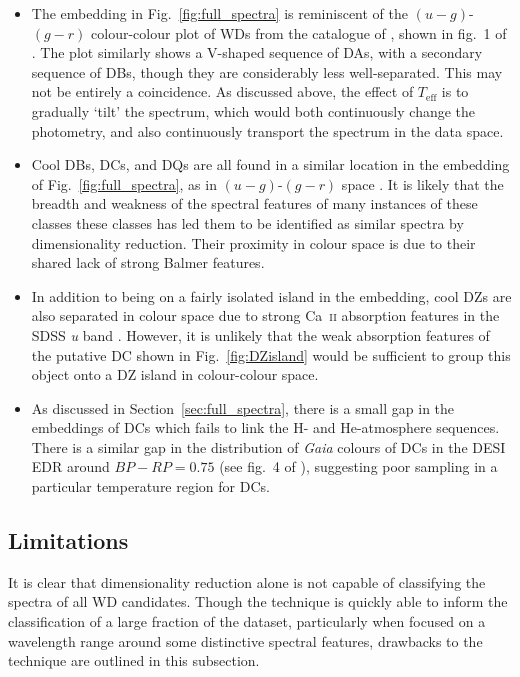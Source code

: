 \documentclass[fleqn,usenatbib]{mnras}
\def\Teff{T_\mathrm{eff}}
\begin{document}
\begin{itemize}
\item
The embedding in Fig.~\ref{fig:full_spectra} is reminiscent of the $(u-g)$-$(g-r)$ colour-colour plot of WDs from the catalogue of \citet{gentilefusillo19}, shown in fig.~1 of \citet{manser20}.
The plot similarly shows a V-shaped sequence of DAs, with a secondary sequence of DBs, though they are considerably less well-separated.
This may not be entirely a coincidence.
As discussed above, the effect of $\Teff$ is to gradually `tilt' the spectrum, which would both continuously change the photometry, and also continuously transport the spectrum in the data space.
\item
Cool DBs, DCs, and DQs are all found in a similar location in the embedding of Fig.~\ref{fig:full_spectra}, as in $(u-g)$-$(g-r)$ space \citep{manser20}.
It is likely that the breadth and weakness of the spectral features of many instances of these classes these classes has led them to be identified as similar spectra by dimensionality reduction.
Their proximity in colour space is due to their shared lack of strong Balmer features.
\item
In addition to being on a fairly isolated island in the embedding, cool DZs are also separated in colour space due to strong Ca~\textsc{ii} absorption features in the SDSS \textit{u} band \citep{hollands15}.
However, it is unlikely that the weak absorption features of the putative DC shown in Fig.~\ref{fig:DZisland} would be sufficient to group this object onto a DZ island in colour-colour space.
\item
As discussed in Section~\ref{sec:full_spectra}, there is a small gap in the embeddings of DCs which fails to link the H- and He-atmosphere sequences.
There is a similar gap in the distribution of \textit{Gaia} colours of DCs in the DESI EDR around $\mathit{BP}-\mathit{RP}=0.75$ (see fig.~4 of \citealt{manser24}), suggesting poor sampling in a particular temperature region for DCs.
\end{itemize}



\subsection{Limitations}

It is clear that dimensionality reduction alone is not capable of classifying the spectra of all WD candidates.
Though the technique is quickly able to inform the classification of a large fraction of the dataset, particularly when focused on a wavelength range around some distinctive spectral features, drawbacks to the technique are outlined in this subsection.
\end{document}
